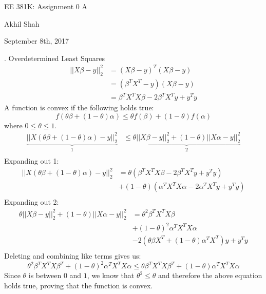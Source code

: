 \documentclass{article}
\begin{document}
\begin{center}
	{\huge EE 381K: Assignment 0 A}
\end{center}
\begin{center}
	Akhil Shah
\end{center}
\begin{center}
	September 8th, 2017
\end{center}

. Overdetermined Least Squares \newline
\begin{align*}
	||X\beta - y||_{2}^{2} &= (X\beta - y)^T(X\beta - y) \\
	&= (\beta^TX^T - y)(X\beta - y) \\
	&= \beta^TX^TX\beta - 2\beta^TX^Ty + y^Ty
\end{align*}
A function is convex if the following holds true:
\begin{equation}
	f(\theta\beta + (1-\theta)\alpha) \leq \theta f(\beta) + (1-\theta)f(\alpha)
\end{equation}
where $ 0 \leq \theta \leq 1 $. 
\begin{align*}
	\underbrace{||X(\theta\beta + (1-\theta)\alpha) - y||_{2}^{2}}_1 &\leq \underbrace{\theta||X\beta - y||^2_2 + (1 - \theta)||X\alpha - y||^2_2}_2 \\
\end{align*}
Expanding out 1:
\begin{align*}
	||X(\theta\beta + (1-\theta)\alpha) - y||_{2}^{2} &= 
	\theta(\beta^TX^TX\beta - 2\beta^TX^Ty + y^Ty) \\ &+ 
	(1 - \theta)(\alpha^TX^TX\alpha - 2\alpha^TX^Ty + y^Ty) \\
\end{align*}
Expanding out 2:
\begin{align*}
	\theta||X\beta - y||^2_2 + (1 - \theta)||X\alpha - y||^2_2 &= \theta^2\beta^TX^TX\beta \\ &+ (1-\theta)^2\alpha^TX^TX\alpha \\&- 2(\theta\beta X^T + (1-\theta)\alpha^TX^T)y +y^Ty \\
\end{align*}
Deleting and combining like terms gives us:
\begin{equation*}
	\theta^2\beta^TX^TX\beta^T + (1-\theta)^2\alpha^TX^TX\alpha \leq \theta\beta^TX^TX\beta^T + (1-\theta)\alpha^TX^TX\alpha 
\end{equation*}
Since $\theta$ is between $0$ and $1$, we know that $\theta^2 \leq \theta$ and therefore the above equation holds true, proving that the function is convex. 
\end{document}
